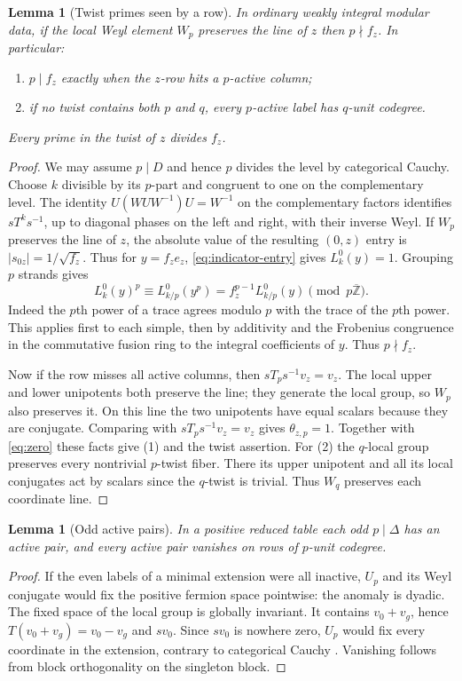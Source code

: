 \documentclass[11pt,a4paper]{article}
\numberwithin{equation}{section}
\newtheorem{lemma}[theorem]{Lemma}
\theoremstyle{remark}
\newcommand{\ZZ}{\mathbb Z}
\begin{document}
\begin{lemma}[Twist primes seen by a row]\label{lem:complement}
In ordinary weakly integral modular data, if the local Weyl element
$W_p$ preserves the line of $z$ then $p\nmid f_z$. In particular:
\begin{enumerate}
\item $p\mid f_z$ exactly when the $z$-row hits a $p$-active column;
\item if no twist contains both $p$ and $q$, every $p$-active
label has $q$-unit codegree.
\end{enumerate}
Every prime in the twist of $z$ divides $f_z$.
\end{lemma}
\begin{proof}
We may assume $p\mid D$ and hence $p$ divides the level by categorical
Cauchy. Choose $k$ divisible by its $p$-part and congruent to one on
the complementary level. The identity $U(WUW^{-1})U=W^{-1}$ on
the complementary factors identifies $sT^ks^{-1}$, up to diagonal
phases on the left and right, with their inverse Weyl. If $W_p$
preserves the line of $z$, the absolute value of the resulting
$(0,z)$ entry is $|s_{0z}|=1/\sqrt{f_z}$. Thus for $y=f_ze_z$,
\eqref{eq:indicator-entry} gives $L_k^0(y)=1$. Grouping $p$ strands
gives
\[
 L_k^0(y)^p\equiv L_{k/p}^0(y^p)
             =f_z^{p-1}L_{k/p}^0(y)\pmod{p\overline{\ZZ}}.
\]
Indeed the $p$th power of a trace agrees modulo $p$ with the trace
of the $p$th power. This applies first to each simple, then by
additivity and the Frobenius congruence in the commutative fusion
ring to the integral coefficients of $y$. Thus $p\nmid f_z$.

Now if the row misses all active columns, then
$sT_p s^{-1}v_z=v_z$. The local upper and lower unipotents both
preserve the line; they generate the local group, so $W_p$ also
preserves it. On this line the two unipotents have equal scalars
because they are conjugate. Comparing with $sT_p s^{-1}v_z=v_z$
gives $\theta_{z,p}=1$. Together with \eqref{eq:zero} these facts
give (1) and the twist assertion. For (2) the $q$-local group
preserves every nontrivial $p$-twist fiber. There its upper
unipotent and all its local conjugates act by scalars since
the $q$-twist is trivial. Thus $W_q$ preserves each coordinate line.
\end{proof}

\begin{lemma}[Odd active pairs]\label{lem:reduced-cauchy}
In a positive reduced table each odd $p\mid\Delta$ has an active pair, and every active pair vanishes on rows of $p$-unit codegree.
\end{lemma}\begin{proof}
If the even labels of a minimal extension were all inactive, $U_p$ and its Weyl conjugate would fix the positive fermion space pointwise: the anomaly is dyadic. The fixed space of the local group is globally invariant. It contains $v_0+v_g$, hence $T(v_0+v_g)=v_0-v_g$ and $sv_0$. Since $sv_0$ is nowhere zero, $U_p$ would fix every coordinate in the extension, contrary to categorical Cauchy \cite[Theorem~3.9]{BNRWFinite}. Vanishing follows from block orthogonality on the singleton block.
\end{proof}
\end{document}
